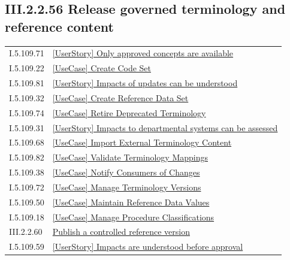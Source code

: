 \subsection*{III.2.2.56 Release governed terminology and reference content}
\label{navigation:III.2.2.56}

\begin{longtable}{p{.22\linewidth}p{.73\linewidth}}
I.5.109.71 & \hyperref[element:03ee2278852546de99d9709e18a91bb0]{[UserStory] Only approved concepts are available} \\
I.5.109.22 & \hyperref[element:05786263507946c7957fff63eae40e45]{[UseCase] Create Code Set} \\
I.5.109.81 & \hyperref[element:05d643571df643b98c7c5b05daf686b8]{[UserStory] Impacts of updates can be understood} \\
I.5.109.32 & \hyperref[element:0a79149c08324ef68dd3f64d060c21c7]{[UseCase] Create Reference Data Set} \\
I.5.109.74 & \hyperref[element:0b442d05d89349aea67d0634494b715a]{[UseCase] Retire Deprecated Terminology} \\
I.5.109.31 & \hyperref[element:0c1248cf14b34b3c9b49dfbe0f016c73]{[UserStory] Impacts to departmental systems can be assessed} \\
I.5.109.68 & \hyperref[element:0dc39a7a92574e64b737a03e35285e65]{[UseCase] Import External Terminology Content} \\
I.5.109.82 & \hyperref[element:0f9dfc16c49c45818c9d5913602d398e]{[UseCase] Validate Terminology Mappings} \\
I.5.109.38 & \hyperref[element:12fa27cddbf1460b89f35539f4773c80]{[UseCase] Notify Consumers of Changes} \\
I.5.109.72 & \hyperref[element:132e15796386460db4f7d5841c96be10]{[UseCase] Manage Terminology Versions} \\
I.5.109.50 & \hyperref[element:133a1deb56764363930a9ad5938f81c4]{[UseCase] Maintain Reference Data Values} \\
I.5.109.18 & \hyperref[element:1391c167b966463683f0879091f5a2dc]{[UseCase] Manage Procedure Classifications} \\
III.2.2.60 & \hyperref[element:156eb857d5c14baaae1c1cc59fe3490b]{Publish a controlled reference version} \\
I.5.109.59 & \hyperref[element:17dfe774c35247bc8d67a6fc90c94e90]{[UserStory] Impacts are understood before approval} \\

\end{longtable}
